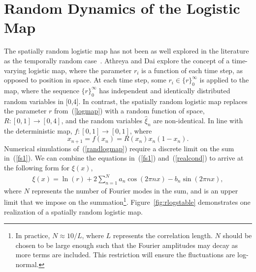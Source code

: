 \section{Random Dynamics of the Logistic Map}
The spatially random logistic map has not been as well explored in the
literature as the temporally random case~\cite{athreya}. Athreya and
Dai explore the concept of a time-varying logistic map, where the
parameter $r_i$ is a function of each time step, as opposed to position
in space. At each time step, some $r_i \in \{r\}_0^\infty$ is applied
to the map, where the
sequence $\{r\}_0^\infty$ has independent and identically distributed
random variables in [0,4]. In contrast, the spatially random logistic
map replaces the parameter $r$ from~(\ref{logmap}) with a random
function of space, $R:[0,1]\to [0,4]$, and the random variables $\hat{\xi}_n$ are
non-identical. In line with the deterministic map, 
$f:[0,1]\to [0,1]$, where
\begin{equation}\label{randlogmap}
x_{n+1} = f(x_n) = R(x_n)x_n(1-x_n).
\end{equation}
Numerical simulations of~(\ref{randlogmap}) require a discrete limit
on the sum in~(\ref{fs1}). We can combine
the equations in~(\ref{fs1}) and~(\ref{realcond}) to arrive at the following form for
$\xi(x)$,
\begin{align}\label{fs2}
\xi(x) = \ln(r) + 2\sum^N_{n=1}a_n\cos(2\pi nx)-b_n\sin(2\pi nx),
\end{align}
where $N$ represents the number of Fourier modes in the sum, and is an
upper limit that we impose on the summation\footnote{In practice, $N
  \approx 10/L$, where $L$ represents the correlation length. $N$
  should be chosen to be large enough such that the Fourier amplitudes
may decay as more terms are included. This restriction will ensure the
fluctuations are log-normal.}. Figure~\ref{fig:rlogstable} demonstrates one realization of a spatially random logistic map.
